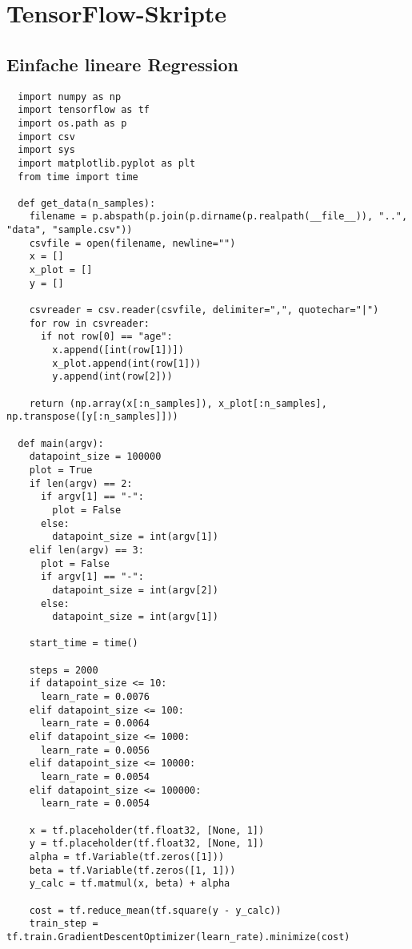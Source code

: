 \chapter{TensorFlow-Skripte}

\section{Einfache lineare Regression}

\begin{verbatim}
  import numpy as np
  import tensorflow as tf
  import os.path as p
  import csv
  import sys
  import matplotlib.pyplot as plt
  from time import time

  def get_data(n_samples):
    filename = p.abspath(p.join(p.dirname(p.realpath(__file__)), "..", "data", "sample.csv"))
    csvfile = open(filename, newline="")
    x = []
    x_plot = []
    y = []

    csvreader = csv.reader(csvfile, delimiter=",", quotechar="|")
    for row in csvreader:
      if not row[0] == "age":
        x.append([int(row[1])])
        x_plot.append(int(row[1]))
        y.append(int(row[2]))

    return (np.array(x[:n_samples]), x_plot[:n_samples], np.transpose([y[:n_samples]]))

  def main(argv):
    datapoint_size = 100000
    plot = True
    if len(argv) == 2:
      if argv[1] == "-":
        plot = False
      else:
        datapoint_size = int(argv[1])
    elif len(argv) == 3:
      plot = False
      if argv[1] == "-":
        datapoint_size = int(argv[2])
      else:
        datapoint_size = int(argv[1])

    start_time = time()

    steps = 2000
    if datapoint_size <= 10:
      learn_rate = 0.0076
    elif datapoint_size <= 100:
      learn_rate = 0.0064
    elif datapoint_size <= 1000:
      learn_rate = 0.0056
    elif datapoint_size <= 10000:
      learn_rate = 0.0054
    elif datapoint_size <= 100000:
      learn_rate = 0.0054

    x = tf.placeholder(tf.float32, [None, 1])
    y = tf.placeholder(tf.float32, [None, 1])
    alpha = tf.Variable(tf.zeros([1]))
    beta = tf.Variable(tf.zeros([1, 1]))
    y_calc = tf.matmul(x, beta) + alpha

    cost = tf.reduce_mean(tf.square(y - y_calc))
    train_step = tf.train.GradientDescentOptimizer(learn_rate).minimize(cost)


\end{verbatim}
